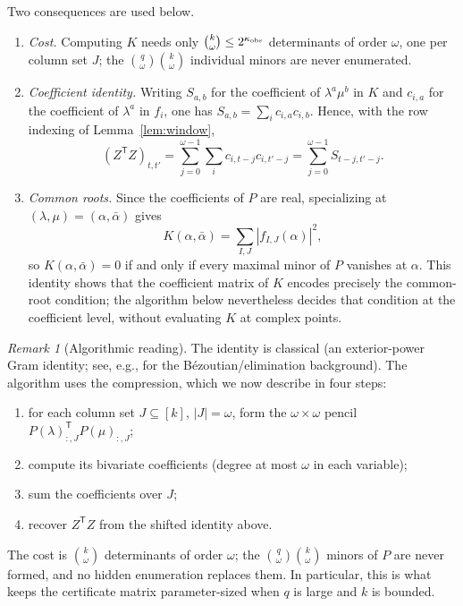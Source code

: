 \documentclass[journal]{IEEEtran}
\theoremstyle{plainn}
\theoremstyle{remark}
\newtheorem{remark}{Remark}
\begin{document}
Two consequences are used below.
\begin{enumerate}
	\item \emph{Cost.} Computing $K$ needs only
	$\binom{k}{\omega}\le2^{\kappa_{\rm obs}}$ determinants of order
	$\omega$, one per column set $J$; the
	$\binom q\omega\binom k\omega$ individual minors are never enumerated.
	\item \emph{Coefficient identity.} Writing $S_{a,b}$ for the
	coefficient of $\lambda^a\mu^b$ in $K$ and $c_{i,a}$ for the
	coefficient of $\lambda^a$ in $f_i$, one has
	$S_{a,b}=\sum_i c_{i,a}c_{i,b}$. Hence, with the row indexing of
	Lemma~\ref{lem:window},
	\begin{equation}
	(Z^{\mathsf T}Z)_{t,t'}
	=\sum_{j=0}^{\omega-1}\sum_i c_{i,t-j}c_{i,t'-j}
	=\sum_{j=0}^{\omega-1}S_{t-j,t'-j}.
	\end{equation}
	\item \emph{Common roots.} Since the coefficients of $P$ are real,
	specializing at $(\lambda,\mu)=(\alpha,\bar\alpha)$ gives
	\begin{equation}
		K(\alpha,\bar\alpha)
		=\sum_{I,J}\left|f_{I,J}(\alpha)\right|^2,
	\end{equation}
	so $K(\alpha,\bar\alpha)=0$ if and only if every maximal minor of
	$P$ vanishes at $\alpha$. This identity shows that the coefficient
	matrix of $K$ encodes precisely the common-root condition; the
	algorithm below nevertheless decides that condition at the coefficient
	level, without evaluating $K$ at complex points.
\end{enumerate}

\begin{remark}[Algorithmic reading]
	The identity is classical (an exterior-power Gram identity; see, e.g.,
	\cite{emi99} for the B\'ezoutian/elimination background). The algorithm
	uses the compression, which we now describe in four steps:
	\begin{enumerate}
		\item for each column set $J\subseteq[k]$, $|J|=\omega$, form the
		$\omega\times\omega$ pencil
		$P(\lambda)_{:,J}^{\mathsf T}P(\mu)_{:,J}$;
		\item compute its bivariate coefficients (degree at most $\omega$ in
		each variable);
		\item sum the coefficients over $J$;
		\item recover $Z^{\mathsf T}Z$ from the shifted identity above.
	\end{enumerate}
	The cost is $\binom{k}{\omega}$ determinants of order $\omega$; the
	$\binom q\omega\binom k\omega$ minors of $P$ are never formed, and no
	hidden enumeration replaces them. In particular, this is what keeps the
	certificate matrix parameter-sized when $q$ is large and $k$ is
	bounded.
\end{remark}
\end{document}
